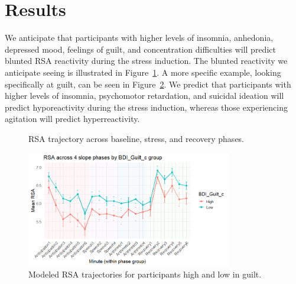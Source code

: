 \documentclass[12pt]{article}
\begin{document}
 \section{Results}
 We anticipate that participants with higher levels of insomnia, anhedonia, depressed mood, feelings of guilt, and concentration difficulties will predict blunted RSA reactivity during the stress induction. The blunted reactivity we anticipate seeing is illustrated in Figure~\ref{fig:rsa_trajectory}. A more specific example, looking specifically at guilt, can be seen in Figure~\ref{fig:rsaguilt_trajectories}. We predict that participants with higher levels of insomnia, psychomotor retardation, and suicidal ideation will predict hyporeactivity during the stress induction, whereas those experiencing agitation will predict hyperreactivity. 
\begin{figure}[ht]
\centering
{}
\caption{RSA trajectory across baseline, stress, and recovery phases.}
\label{fig:rsa_trajectory}
\end{figure}

\begin{figure}[H]
  \centering
  \includegraphics[width=0.8\textwidth]{Guilt.png}
  \caption{Modeled RSA trajectories for participants high and low in guilt.}
  \label{fig:rsaguilt_trajectories}
\end{figure}
\end{document}
